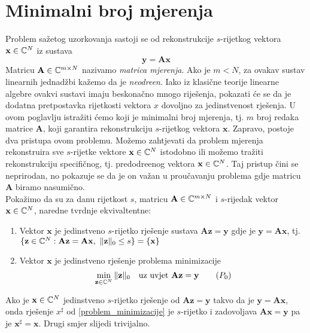 \documentclass[a4paper,twoside,12pt]{memoir} %
\newcommand{\vect}[1]{\mathbf{#1}}
\renewcommand{\vec}{\vect}
\newcommand{\norm}[1]{\|{#1}\|}
\begin{document}
\section[Minimalni broj mjerenja][Minimalni broj mjerenja]{Minimalni broj mjerenja}
Problem sa\v{z}etog uzorkovanja sastoji se od rekonstrukcije $s$-rijetkog vektora $\vec{x} \in \C^N$ iz sustava
\[\vec{y} = \vec{A}\vec{x}\]
Matricu $\vec{A} \in \C^{m\times N}$ nazivamo \textit{matrica mjerenja}. Ako je $m < N$, za ovakav sustav linearnih jednad\v{z}bi ka\v{z}emo da je \textit{neodre\dj en}. Iako iz klasi\v{c}ne teorije linearne algebre ovakvi sustavi imaju beskona\v{c}no mnogo rije\v{s}enja, pokazati \'ce se da je dodatna pretpostavka rijetkosti vektora $x$ dovoljno za jedinstvenost rje\v{s}enja. U ovom poglavlju istra\v{z}iti \'cemo koji je minimalni broj mjerenja, tj. $m$ broj redaka matrice $\vec{A}$, koji garantira rekonstrukciju $s$-rijetkog vektora $\vec{x}$. Zapravo, postoje dva pristupa ovom problemu. Mo\v{z}emo zahtjevati da problem mjerenja rekonstruira sve $s$-rijetke vektore $\vec{x} \in \C^N$ istodobno ili mo\v{z}emo tra\v{z}iti rekonstrukciju specifi\v{c}nog, tj. predodre\dj enog vektora $\vec{x} \in \C^N$. Taj pristup \v{c}ini se neprirodan, no pokazuje se da je on va\v{z}an u prou\v{c}avanju problema gdje matricu $\vec{A}$ biramo nasumi\v{c}no. \\ 
\indent Poka\v{z}imo da su za danu rijetkost $s$, matricu $\vec{A} \in \C^{m \times N}$ i $s$-rijedak vektor $\vec{x} \in \C^N$, naredne tvrdnje ekvivaltentne: 
\begin{enumerate}
    \item Vektor $\vec{x}$ je jedinstveno $s$-rijetko rje\v{s}enje sustava $\vec{A}\vec{z}=\vec{y}$ gdje je $\vec{y} = \vec{Ax}$, tj. $\{\vec{z} \in \C^N : \vec{A}\vec{z}= \vec{A}\vec{x},\ \norm{\vec{z}}_0 \leq s\} = \{\vec{x}\}$
    \item Vektor $\vec{x}$ je jedinstveno rje\v{s}enje problema minimizacije
        \begin{equation}\label{problem_minimizacije}
            \min\limits_{\vec{z} \in \C^N} \norm{\vec{z}}_0\quad \text{uz uvjet}\ \vec{Az} = \vec y \tag{$P_{0}$}
        \end{equation}
\end{enumerate}
Ako je $\vec{x} \in \C^N$ jedinstveno $s$-rijetko rje\v{s}enje od $\vec{Az} = \vec y$ takvo da je $\vec y = \vec{Ax}$, onda rje\v{s}enje $x^{\sharp}$ od \eqref{problem_minimizacije} je $s$-rijetko i zadovoljava $\vec{Ax} = \vec y$ pa je $\vec x^\sharp = \vec x$. Drugi smjer slijedi trivijalno.
\end{document}
